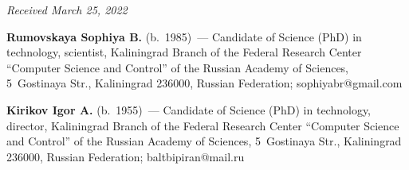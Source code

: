 \vspace*{-6pt}

\hfill{\small\textit{Received March 25, 2022}}
   
   \Contr
   
   \noindent
   \textbf{Rumovskaya Sophiya B.} (b.\ 1985)~--- Candidate of Science (PhD) in technology, 
scientist, Kaliningrad Branch of the Federal Research Center ``Computer Science and Control'' of 
the Russian Academy of Sciences, 5~Gostinaya Str., Kaliningrad 236000, Russian Federation; 
\mbox{sophiyabr@gmail.com}
   
   \vspace*{3pt}
   
   \noindent
   \textbf{Kirikov Igor A.} (b.\ 1955)~--- Candidate of Science (PhD) in technology, director, 
Kaliningrad Branch of the Federal Research Center ``Computer Science and Control'' of the Russian 
Academy of Sciences, 5~Gostinaya Str., Kaliningrad 236000, Russian Federation; 
\mbox{baltbipiran@mail.ru}

\label{end\stat}

\renewcommand{\bibname}{\protect\rm Литература}       